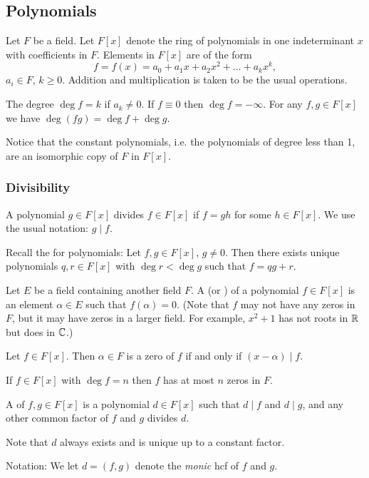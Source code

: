 \subsection{Polynomials}
Let $F$ be a field. Let $F[x]$ denote the ring of polynomials in one indeterminant $x$ with coefficients in $F$. Elements in $F[x]$ are of the form
\[
	f = f(x) = a_0 + a_1 x + a_2 x^2 + \dots + a_k x^k,
\]
$a_i \in F$, $k \geq 0$. Addition and multiplication is taken to be the usual operations.

The degree $\deg{f} = k$ if $a_k \neq 0$. If $f \equiv 0$ then $\deg{f} = -\infty$. For any $f, g \in F[x]$ we have $\deg(fg) = \deg{f} + \deg{g}$.

Notice that the constant polynomials, i.e. the polynomials of degree less than 1, are an isomorphic copy of $F$ in $F[x]$.

\subsubsection{Divisibility}
A polynomial $g \in F[x]$ divides $f \in F[x]$ if $f = gh$ for some $h \in F[x]$. We use the usual notation: $g \mid f$.

Recall the  for polynomials: Let $f, g \in F[x]$, $g \neq 0$. Then there exists unique polynomials $q, r \in F[x]$ with $\deg{r} < \deg{g}$ such that $f = qg + r$.

Let $E$ be a field containing another field $F$. A  (or ) of a polynomial $f \in F[x]$ is an element $\alpha \in E$ such that $f(\alpha) = 0$. (Note that $f$ may not have any zeros in $F$, but it may have zeros in a larger field. For example, $x^2 + 1$ has not roots in $\mathbb{R}$ but does in $\mathbb{C}$.)

\begin{corollary}
	Let $f \in F[x]$. Then $\alpha \in F$ is a zero of $f$ if and only if $(x - \alpha) \mid f$.
\end{corollary}

\begin{corollary}
	If $f \in F[x]$ with $\deg{f} = n$ then $f$ has at most $n$ zeros in $F$.
\end{corollary}

\begin{definition}
	A  of $f, g \in F[x]$ is a polynomial $d \in F[x]$ such that $d \mid f$ and $d \mid g$, and any other common factor of $f$ and $g$ divides $d$.
	
	Note that $d$ always exists and is unique up to a constant factor.
	
	Notation: We let $d = (f, g)$ denote the \emph{monic} hcf of $f$ and $g$.
\end{definition}

